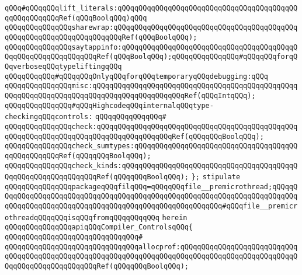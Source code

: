 \verb|qQQq#qQQqqQQqlift_literals:qQQqqQQqqQQqqQQqqQQqqQQqqQQqqQQqqQQqqQQqqQQqqQQqqQQqqQQqRef(qQQqBoolqQQq)qQQq|\newline
\verb|qQQqqQQqqQQqqQQqsharewrap:qQQqqQQqqQQqqQQqqQQqqQQqqQQqqQQqqQQqqQQqqQQqqQQqqQQqqQQqqQQqqQQqqQQqqQQqRef(qQQqBoolqQQq);|\newline
\verb|qQQqqQQqqQQqqQQqsaytappinfo:qQQqqQQqqQQqqQQqqQQqqQQqqQQqqQQqqQQqqQQqqQQqqQQqqQQqqQQqqQQqqQQqRef(qQQqBoolqQQq);qQQqqQQqqQQqqQQq#qQQqqQQqforqQQqverboseqQQqtypeliftingqQQq|\newline
\newline
\verb|qQQqqQQqqQQq#qQQqqQQqOnlyqQQqforqQQqtemporaryqQQqdebugging:qQQq|\newline
\verb|qQQqqQQqqQQqqQQqmisc:qQQqqQQqqQQqqQQqqQQqqQQqqQQqqQQqqQQqqQQqqQQqqQQqqQQqqQQqqQQqqQQqqQQqqQQqqQQqqQQqqQQqqQQqqQQqRef(qQQqIntqQQq);|\newline
\newline
\verb|qQQqqQQqqQQqqQQq#qQQqHighcodeqQQqinternalqQQqtype-checkingqQQqcontrols:|\newline
\verb|qQQqqQQqqQQqqQQq#|\newline
\verb|qQQqqQQqqQQqqQQqcheck:qQQqqQQqqQQqqQQqqQQqqQQqqQQqqQQqqQQqqQQqqQQqqQQqqQQqqQQqqQQqqQQqqQQqqQQqqQQqqQQqqQQqqQQqRef(qQQqqQQqBoolqQQq);|\newline
\verb|qQQqqQQqqQQqqQQqcheck_sumtypes:qQQqqQQqqQQqqQQqqQQqqQQqqQQqqQQqqQQqqQQqqQQqqQQqqQQqRef(qQQqqQQqBoolqQQq);|\newline
\verb|qQQqqQQqqQQqqQQqcheck_kinds:qQQqqQQqqQQqqQQqqQQqqQQqqQQqqQQqqQQqqQQqqQQqqQQqqQQqqQQqqQQqqQQqRef(qQQqqQQqBoolqQQq);|\newline
\verb|};|\newline
\newline
\verb|stipulate|\newline
\verb|qQQqqQQqqQQqqQQqpackageqQQqfilqQQq=qQQqqQQqfile__premicrothread;qQQqqQQqqQQqqQQqqQQqqQQqqQQqqQQqqQQqqQQqqQQqqQQqqQQqqQQqqQQqqQQqqQQqqQQqqQQqqQQqqQQqqQQqqQQqqQQqqQQqqQQqqQQqqQQqqQQqqQQqqQQqqQQq#qQQqfile__premicrothreadqQQqqQQqisqQQqfromqQQqqQQqqQQq|\newline
\verb|herein|\newline
\newline
\verb|qQQqqQQqqQQqqQQqapiqQQqCompiler_ControlsqQQq{|\newline
\verb|qQQqqQQqqQQqqQQqqQQqqQQqqQQqqQQq#|\newline
\verb|qQQqqQQqqQQqqQQqqQQqqQQqqQQqqQQqallocprof:qQQqqQQqqQQqqQQqqQQqqQQqqQQqqQQqqQQqqQQqqQQqqQQqqQQqqQQqqQQqqQQqqQQqqQQqqQQqqQQqqQQqqQQqqQQqqQQqqQQqqQQqqQQqqQQqqQQqqQQqRef(qQQqqQQqBoolqQQq);|\newline

